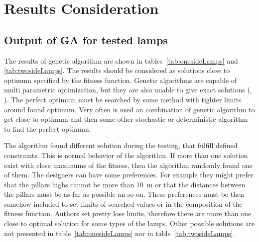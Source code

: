 \section{Results Consideration}
\label{sec:Results}
\subsection{Output of GA for tested lamps}

The results of genetic algorithm are shown in tables~\ref{tab:onesideLamps} and \ref{tab:twosideLamps}. The results should be considered as solutions close to optimum specified by the fitness function. Genetic algorithms are capable of multi parametric optimization, but they are also unable to give exact solutions (\cite{Zelinka2009}, \cite{Fogel2006}). The perfect optimum must be searched by some method with tighter limits around found optimum. Very often is used an combination of genetic algorithm to get close to optimum and then some other stochastic or deterministic algorithm to find the perfect optimum.

The algorithm found different solution during the testing, that fulfill defined constraints. This is normal behavior of the algorithm. If more than one solution exist with close maximums of the fitness, then the algorithm randomly found one of them. The designers can have some preferences. For example they might prefer that the pillars highs cannot be more than 10~m or that the distances between the pillars must be as far as possible an so on. These preferences must be then somehow included to set limits of searched values or in the composition of the fitness function. Authors set pretty lose limits, therefore there are more than one close to optimal solution for some types of the lamps. Other possible solutions are not presented in table~\ref{tab:onesideLamps} nor in table~\ref{tab:twosideLamps}.
 
